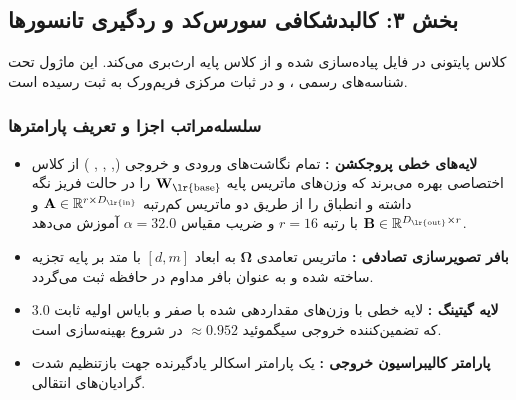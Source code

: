 \subsection*{بخش ۳: کالبدشکافی سورس‌کد و ردگیری تانسورها }
کلاس پایتونی  در فایل  پیاده‌سازی شده و از کلاس پایه  ارث‌بری می‌کند. این ماژول تحت شناسه‌های رسمی ،  و  در ثبات مرکزی فریم‌ورک به ثبت رسیده است.

\subsubsection*{سلسله‌مراتب اجزا و تعریف پارامترها}
\begin{itemize}
    \item \textbf{لایه‌های خطی پروجکشن :} تمام نگاشت‌های ورودی و خروجی (, , , ) از کلاس اختصاصی  بهره می‌برند که وزن‌های ماتریس پایه $\mathbf{W}_{\text{\lr{base}}}$ را در حالت فریز نگه داشته و انطباق را از طریق دو ماتریس کم‌رتبه $\mathbf{A} \in \mathbb{R}^{r \times D_{\text{\lr{in}}}}$ و $\mathbf{B} \in \mathbb{R}^{D_{\text{\lr{out}}} \times r}$ با رتبه $r=16$ و ضریب مقیاس $\alpha=32.0$ آموزش می‌دهد.
    \item \textbf{بافر تصویرسازی تصادفی :} ماتریس تعامدی $\boldsymbol{\Omega}$ به ابعاد $[d, m]$ با متد  بر پایه تجزیه  ساخته شده و به عنوان بافر مداوم در حافظه ثبت می‌گردد.
    \item \textbf{لایه گیتینگ :} لایه خطی  با وزن‌های مقداردهی شده با صفر و بایاس اولیه ثابت $3.0$ که تضمین‌کننده خروجی سیگموئید $\approx 0.952$ در شروع بهینه‌سازی است.
    \item \textbf{پارامتر کالیبراسیون خروجی :} یک پارامتر اسکالر یادگیرنده  جهت بازتنظیم شدت گرادیان‌های انتقالی.
\end{itemize}

